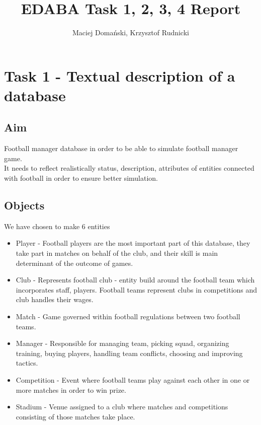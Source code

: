 \documentclass{report}
\title{EDABA Task 1, 2, 3, 4 Report}
\author{Maciej Domański, Krzysztof Rudnicki}
\begin{document}
\maketitle
\chapter{Task 1 - Textual description of a database}
\section{Aim}

Football manager database in order to be able to simulate football manager game. \\ 
It needs to reflect realistically status, description, attributes of entities connected with football in order to ensure better simulation. \\ 


\section{Objects}  \label{Objects Section}
We have chosen to make 6 entities \\ 
\begin{itemize}
    \item Player - Football players are the most important part of this database, they take part in matches on behalf of the club, and their skill is main determinant of the outcome of games.
    \item Club - Represents football club - entity build around the football team which incorporates staff, players. Football teams represent clubs in competitions and club handles their wages. 
    \item Match - Game governed within football regulations between two football teams.
    \item Manager - Responsible for managing team, picking squad, organizing training, buying players, handling team conflicts, choosing and improving tactics. 
    \item Competition - Event where football teams play against each other in one or more matches in order to win prize. 
    \item Stadium - Venue assigned to a club where matches and competitions consisting of those matches take place.
\end{itemize} 
\end{document}
